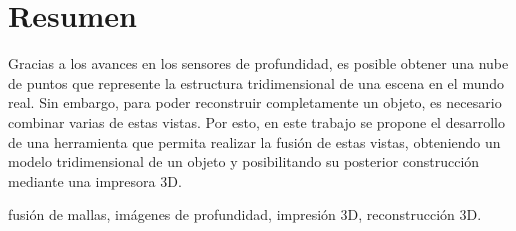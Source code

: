 \documentclass{pfc}
\subtitle{Informe final}
\begin{document}
\frontmatter
	\maketitle
	\chapter{Resumen}
		Gracias a los avances en los sensores de profundidad,
		es posible obtener una nube de puntos que represente la estructura tridimensional de una escena en el mundo real.
		Sin embargo, para poder reconstruir completamente un objeto, es necesario combinar varias de estas vistas.
		Por esto, en este trabajo se propone el desarrollo de una herramienta
		que permita realizar la fusión de estas vistas,
		obteniendo un modelo tridimensional de un objeto
		y posibilitando su posterior construcción mediante una impresora 3D.

		 fusión de mallas, imágenes de profundidad, impresión 3D, reconstrucción 3D.
	\tableofcontents
\mainmatter
	
	
	
	
	
	

	
	
\end{document}

